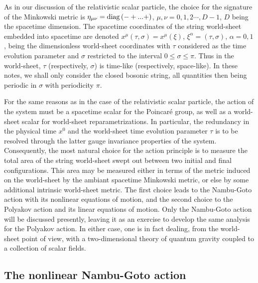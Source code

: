 \documentclass[a4paper,11pt]{article}
\begin{document}
As in our discussion of the relativistic scalar particle, the choice
for the signature of the Minkowski metric is 
$\eta_{\mu\nu}={\rm diag}\,(-+...+)$, $\mu,\nu=0,1,2\cdots,D-1$,
$D$ being the spacetime dimension. The spacetime coordinates of the
string world-sheet embedded into spacetime are denoted 
$x^\mu(\tau,\sigma)=x^\mu(\xi)$, $\xi^\alpha=(\tau,\sigma)$, $\alpha=0,1$,
being the dimensionless world-sheet coordinates with $\tau$ considered
as the time evolution parameter and $\sigma$ restricted to the interval
$0\le\sigma\le\pi$. Thus in the world-sheet, $\tau$ (respectively, $\sigma$) 
is time-like (respectively, space-like). In these notes, we shall only
consider the closed bosonic string, all quantities then being periodic
in $\sigma$ with periodicity $\pi$.

For the same reasons as in the case of the relativistic scalar particle,
the action of the system must be a spacetime scalar for the Poincar\'e
group, as well as a world-sheet scalar for world-sheet reparametrizations.
In particular, the redundancy in the physical time $x^0$ and the world-sheet
time evolution parameter $\tau$ is to be resolved through the latter gauge 
invariance properties
of the system. Consequently, the most natural choice for the action
principle is to measure the total area of the string world-sheet swept out
between two initial and final configurations. This area may be measured either
in terms of the metric induced on the world-sheet by the ambiant spacetime
Minkowski metric, or else by some additional intrinsic world-sheet metric.
The first choice leads to the Nambu-Goto action with its nonlinear equations
of motion, and the second choice to the Polyakov action and its linear
equations of motion. Only the Nambu-Goto action will be discussed
presently, leaving it as an exer\-ci\-se to develop the same analysis
for the Polyakov action. In either case, one is in fact dealing, from the 
world-sheet point of view, with a two-dimensional theory of quantum 
gravity coupled to a collection of scalar fields.

\subsection{The nonlinear Nambu-Goto action}
\label{Subsect7.1}
\end{document}
